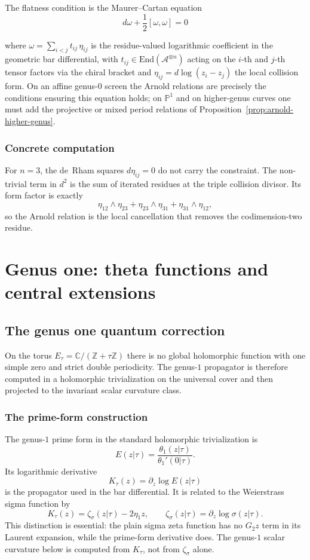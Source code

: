 The flatness condition is the Maurer--Cartan equation
\[d\omega + \frac{1}{2}[\omega, \omega] = 0\]

where $\omega = \sum_{i<j} t_{ij}\, \eta_{ij}$ is the residue-valued
logarithmic coefficient in the geometric bar differential, with
$t_{ij} \in \mathrm{End}(\mathcal{A}^{\otimes n})$ acting on the $i$-th
and $j$-th tensor factors via the chiral bracket and
$\eta_{ij} = d\log(z_i - z_j)$ the local collision form. On an affine
genus-$0$ screen the Arnold relations are precisely the conditions
ensuring this equation holds; on $\mathbb{P}^1$ and on higher-genus
curves one must add the projective or mixed period relations of
Proposition~\ref{prop:arnold-higher-genus}.

\subsubsection{Concrete computation}

For $n=3$, the de~Rham squares $d\eta_{ij}=0$ do not carry the
constraint.  The non-trivial term in $d^2$ is the sum of iterated
residues at the triple collision divisor.  Its form factor is exactly
\[
\eta_{12}\wedge\eta_{23}
+\eta_{23}\wedge\eta_{31}
+\eta_{31}\wedge\eta_{12},
\]
so the Arnold relation is the local cancellation that removes the
codimension-two residue.

\section{Genus one: theta functions and central extensions}

\subsection{The genus one quantum correction}

On the torus $E_\tau=\mathbb C/(\mathbb Z+\tau\mathbb Z)$ there is no
global holomorphic function with one simple zero and strict double
periodicity.  The genus-$1$ propagator is therefore computed in a
holomorphic trivialization on the universal cover and then projected to
the invariant scalar curvature class.

\subsubsection{The prime-form construction}

The genus-$1$ prime form in the standard holomorphic
trivialization is
\[
E(z|\tau)=\frac{\theta_1(z|\tau)}{\theta_1'(0|\tau)}.
\]
Its logarithmic derivative
\[
K_\tau(z)=\partial_z\log E(z|\tau)
\]
is the propagator used in the bar differential.  It is related to the
Weierstrass sigma function by
\[
K_\tau(z)=\zeta_\sigma(z|\tau)-2\eta_1 z,
\qquad
\zeta_\sigma(z|\tau)=\partial_z\log\sigma(z|\tau).
\]
This distinction is essential: the plain sigma zeta function has no
$G_2z$ term in its Laurent expansion, while the prime-form derivative
does.  The genus-$1$ scalar curvature below is computed from
$K_\tau$, not from $\zeta_\sigma$ alone.

